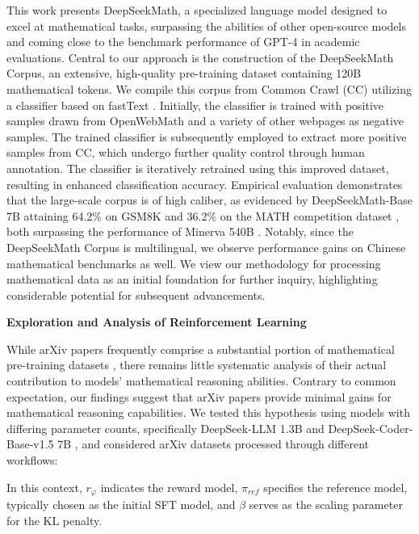 This work presents DeepSeekMath, a specialized language model designed to excel at mathematical tasks, surpassing the abilities of other open-source models and coming close to the benchmark performance of GPT-4 in academic evaluations. Central to our approach is the construction of the DeepSeekMath Corpus, an extensive, high-quality pre-training dataset containing 120B mathematical tokens. We compile this corpus from Common Crawl (CC) utilizing a classifier based on fastText \citep{joulin2016fasttext}. Initially, the classifier is trained with positive samples drawn from OpenWebMath \citep{openwebmath} and a variety of other webpages as negative samples. The trained classifier is subsequently employed to extract more positive samples from CC, which undergo further quality control through human annotation. The classifier is iteratively retrained using this improved dataset, resulting in enhanced classification accuracy. Empirical evaluation demonstrates that the large-scale corpus is of high caliber, as evidenced by DeepSeekMath-Base 7B attaining 64.2\% on GSM8K \citep{gsm8k} and 36.2\% on the MATH competition dataset \citep{MATH}, both surpassing the performance of Minerva 540B \citep{minerva}. Notably, since the DeepSeekMath Corpus is multilingual, we observe performance gains on Chinese mathematical benchmarks \citep{wei2023cmath,agieval} as well. We view our methodology for processing mathematical data as an initial foundation for further inquiry, highlighting considerable potential for subsequent advancements.

\textbf{Exploration and Analysis of Reinforcement Learning}



While arXiv papers frequently comprise a substantial portion of mathematical pre-training datasets \citep{minerva,gpt-f,llemma,mathpile}, there remains little systematic analysis of their actual contribution to models’ mathematical reasoning abilities. Contrary to common expectation, our findings suggest that arXiv papers provide minimal gains for mathematical reasoning capabilities. We tested this hypothesis using models with differing parameter counts, specifically DeepSeek-LLM 1.3B and DeepSeek-Coder-Base-v1.5 7B \citep{deepseek-coder}, and considered arXiv datasets processed through different workflows:

In this context, $r_\varphi$ indicates the reward model, $\pi_{ref}$ specifies the reference model, typically chosen as the initial SFT model, and $\beta$ serves as the scaling parameter for the KL penalty.

